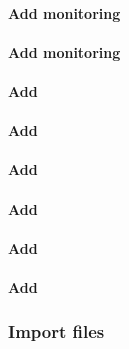\documentclass[letterpaper]{article}
\begin{document}
\paragraph{Add \Nagios{} monitoring}


\paragraph{Add \Ganglia{} monitoring}


\paragraph{Add \clustershell{}}


\paragraph{Add \mrsh{}}


\paragraph{Add \genders{}}


\paragraph{Add \conman{}} \label{sec:add_conman}


\paragraph{Add \nhc{}} \label{sec:add_nhc}


\paragraph{Add \GEOPM{}} \label{sec:add_geopm}


\subsubsection{Import files} \label{sec:file_import}

\vspace*{0.3cm}






\end{document}
